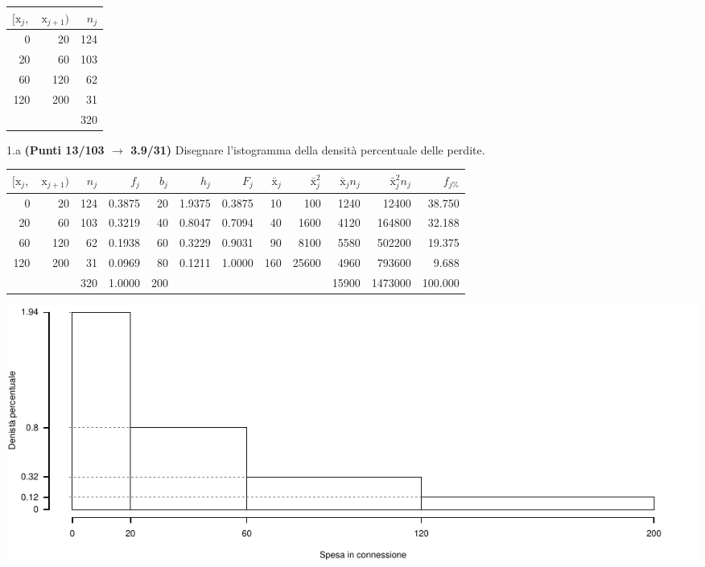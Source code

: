 \documentclass[
  11pt,
]{book}
\theoremstyle{mytheoremstyle}
\theoremstyle{mydefstyle}
\newenvironment{sol}
  {
  \begin{tcolorbox}[enhanced,breakable,arc=0.1mm,boxrule=1pt,colback=white,colframe=iblue,
  title=\bf \fontfamily{lmss}\selectfont \hspace{.5 cm} Soluzione,drop fuzzy shadow]

}{
\end{tcolorbox}
  }
\begin{document}
\begin{table}[H]
\centering
\begin{tabular}{rrr}
\toprule
$[\text{x}_j,$ & $\text{x}_{j+1})$ & $n_j$\\
\midrule
0 & 20 & 124\\
20 & 60 & 103\\
60 & 120 & 62\\
120 & 200 & 31\\
 &  & 320\\
\bottomrule
\end{tabular}
\end{table}

1.a \textbf{(Punti 13/103 \(\rightarrow\) 3.9/31)} Disegnare l'istogramma della densità percentuale delle perdite.

\begin{sol}

\begin{table}[H]
\centering
\begin{tabular}{rrrrrrrrrrrr}
\toprule
$[\text{x}_j,$ & $\text{x}_{j+1})$ & $n_j$ & $f_j$ & $b_j$ & $h_j$ & $F_j$ & $\bar{\text{x}}_j$ & $\bar{\text{x}}_j^2$ & $\bar{\text{x}}_jn_j$ & $\bar{\text{x}}_j^2 n_j$ & $f_{j\%}$\\
\midrule
0 & 20 & 124 & 0.3875 & 20 & 1.9375 & 0.3875 & 10 & 100 & 1240 & 12400 & 38.750\\
20 & 60 & 103 & 0.3219 & 40 & 0.8047 & 0.7094 & 40 & 1600 & 4120 & 164800 & 32.188\\
60 & 120 & 62 & 0.1938 & 60 & 0.3229 & 0.9031 & 90 & 8100 & 5580 & 502200 & 19.375\\
120 & 200 & 31 & 0.0969 & 80 & 0.1211 & 1.0000 & 160 & 25600 & 4960 & 793600 & 9.688\\
 &  & 320 & 1.0000 & 200 &  &  &  &  & 15900 & 1473000 & 100.000\\
\bottomrule
\end{tabular}
\end{table}

\begin{center}\includegraphics{Esami_passati_con_soluzioni_files/figure-latex/unnamed-chunk-72-1} \end{center}

\end{sol}
\end{document}
